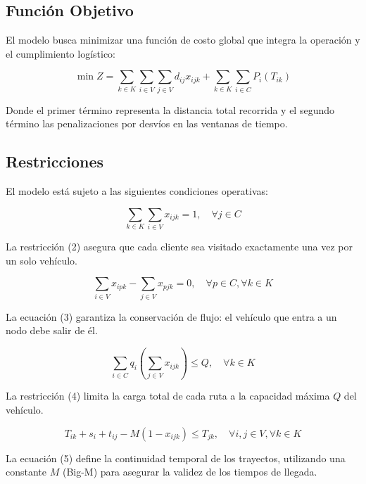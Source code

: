 \documentclass[letter, 10pt]{article}
\begin{document}
\subsection{Funci\'on Objetivo}

El modelo busca minimizar una funci\'on de costo global que integra la operaci\'on y el cumplimiento log\'istico:

\begin{equation}
\min Z = \sum_{k \in K} \sum_{i \in V} \sum_{j \in V} d_{ij} x_{ijk} + \sum_{k \in K} \sum_{i \in C} P_i(T_{ik})
\end{equation}

Donde el primer t\'ermino representa la distancia total recorrida y el segundo t\'ermino las penalizaciones por desv\'ios en las ventanas de tiempo.

\subsection{Restricciones}

El modelo est\'a sujeto a las siguientes condiciones operativas:

\begin{equation}
\sum_{k \in K} \sum_{i \in V} x_{ijk} = 1, \quad \forall j \in C
\end{equation}

La restricci\'on (2) asegura que cada cliente sea visitado exactamente una vez por un solo veh\'iculo.

\begin{equation}
\sum_{i \in V} x_{ipk} - \sum_{j \in V} x_{pjk} = 0, \quad \forall p \in C, \forall k \in K
\end{equation}

La ecuaci\'on (3) garantiza la conservaci\'on de flujo: el veh\'iculo que entra a un nodo debe salir de \'el.

\begin{equation}
\sum_{i \in C} q_i \left( \sum_{j \in V} x_{ijk} \right) \leq Q, \quad \forall k \in K
\end{equation}

La restricci\'on (4) limita la carga total de cada ruta a la capacidad m\'axima $Q$ del veh\'iculo.

\begin{equation}
T_{ik} + s_i + t_{ij} - M(1 - x_{ijk}) \leq T_{jk}, \quad \forall i, j \in V, \forall k \in K
\end{equation}

La ecuaci\'on (5) define la continuidad temporal de los trayectos, utilizando una constante $M$ (Big-M) para asegurar la validez de los tiempos de llegada.
\end{document}
